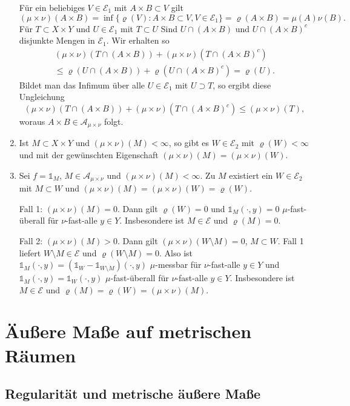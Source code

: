 \documentclass[a4paper,twoside,DIV15,BCOR12mm]{scrbook}
\newcommand{\A}{\mathcal A}
\newcommand{\ind}{\mathds 1}
\begin{document}
\begin{beweis}
\begin{enumerate}
Für ein beliebiges $V\in\mathcal E_1$ mit $A\times B\subset V$ gilt
\[
(\mu\times\nu)(A\times B) =\inf\{\varrho(V):A\times B\subset V,V\in\mathcal{E}_1\}= \varrho(A\times B) = \mu(A) \nu(B).
\]
Für $T\subset X\times Y$ und $U\in \mathcal E_1$ mit $T\subset U$ Sind
$U\cap (A\times B)$ und $U\cap (A\times B)^c$ disjunkte Mengen in $\mathcal E_1$. Wir  erhalten so
\begin{multline*}
(\mu\times \nu) (T\cap (A\times B)) + (\mu\times\nu)(T\cap (A\times B)^c)
\\ \le \varrho(U\cap (A\times B)) + \varrho(U\cap (A\times B)^c) = \varrho(U).
\end{multline*}
Bildet man das Infimum über alle $U\in\mathcal E_1$ mit $U\supset T$, so ergibt diese Ungleichung
\[
(\mu\times \nu) (T\cap (A\times B)) + (\mu\times\nu)(T\cap (A\times B)^c) \le (\mu\times \nu)(T),
\]
woraus $A\times B\in\A_{\mu\times\nu}$ folgt.
\item Ist $M\subset X\times Y$ und $(\mu\times\nu)(M)<\infty$, so gibt es $W\in\mathcal E_2$ mit $\varrho(W)<\infty$ und mit der gewünschten Eigenschaft $(\mu\times\nu)(M) = (\mu\times\nu)(W)$.
\item Sei $f=\ind_M$, $M\in\A_{\mu\times\nu}$ und $(\mu\times\nu)(M)<\infty$. Zu $M$ existiert ein $W\in\mathcal E_2$ mit $M\subset W$ und $(\mu\times\nu)(M) = (\mu\times\nu)(W) =\varrho(W)$.

Fall 1: $(\mu\times\nu)(M) = 0$. Dann gilt $\varrho(W)=0$ und $\ind_M(\cdot,y)=0$ $\mu$-fast-überall für $\nu$-fast-alle $y\in Y$. Insbesondere ist $M\in\mathcal E$ und $\varrho(M)=0$.

Fall 2: $(\mu\times\nu)(M) > 0$. Dann gilt $(\mu\times\nu)(W\setminus M) = 0$, $M\subset W$. Fall 1 liefert $W\setminus M\in\mathcal E$ und $\varrho(W\setminus M)=0$. Also ist $\ind_M(\cdot, y) = (\ind_W - \ind_{W\setminus M})(\cdot,y)$ $\mu$-messbar für $\nu$-fast-alle $y\in Y$ und  $\ind_M(\cdot,y) = \ind_W(\cdot,y)$ $\mu$-fast-überall für $\nu$-fast-alle $y\in Y$. Insbesondere ist $M\in\mathcal E$ und $\varrho(M) = \varrho(W) = (\mu\times\nu)(M)$.
\end{enumerate}
\end{beweis}

\chapter{Äußere Maße auf metrischen Räumen}

\section{Regularität und metrische äußere Maße}
\end{document}
